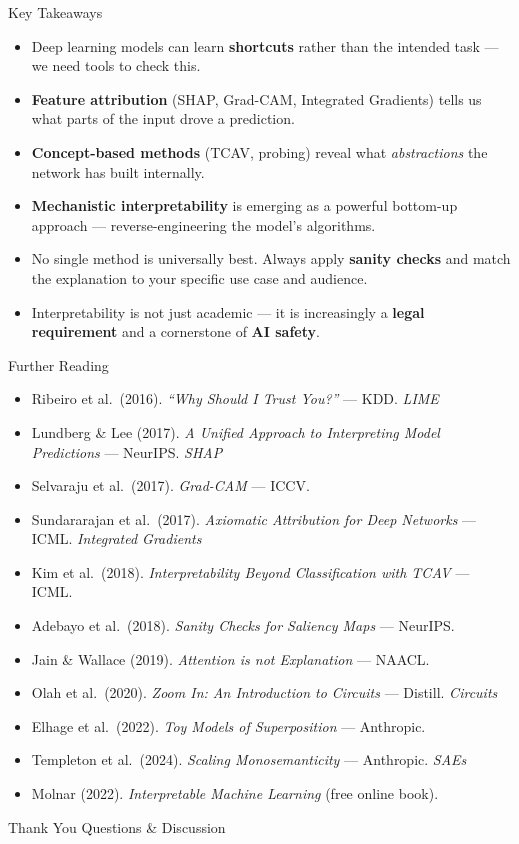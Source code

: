 \documentclass[aspectratio=169]{beamer}
\begin{document}
\begin{frame}{Key Takeaways}
  \begin{itemize}
    \setlength\itemsep{0.7em}
    \item Deep learning models can learn \textbf{shortcuts} rather than
          the intended task — we need tools to check this.
    \item \textbf{Feature attribution} (SHAP, Grad-CAM, Integrated Gradients)
          tells us what parts of the input drove a prediction.
    \item \textbf{Concept-based methods} (TCAV, probing) reveal what
          \emph{abstractions} the network has built internally.
    \item \textbf{Mechanistic interpretability} is emerging as a powerful
          bottom-up approach — reverse-engineering the model's algorithms.
    \item No single method is universally best. Always apply
          \textbf{sanity checks} and match the explanation to your
          specific use case and audience.
    \item Interpretability is not just academic — it is increasingly a
          \textbf{legal requirement} and a cornerstone of \textbf{AI safety}.
  \end{itemize}
\end{frame}

\begin{frame}{Further Reading}
  \footnotesize
  \begin{itemize}
    \item Ribeiro et al.\ (2016). \textit{``Why Should I Trust You?''} — KDD.
          \hfill \textit{LIME}
    \item Lundberg \& Lee (2017). \textit{A Unified Approach to Interpreting Model Predictions}
          — NeurIPS. \hfill \textit{SHAP}
    \item Selvaraju et al.\ (2017). \textit{Grad-CAM} — ICCV.
    \item Sundararajan et al.\ (2017). \textit{Axiomatic Attribution for Deep Networks}
          — ICML. \hfill \textit{Integrated Gradients}
    \item Kim et al.\ (2018). \textit{Interpretability Beyond Classification with TCAV}
          — ICML.
    \item Adebayo et al.\ (2018). \textit{Sanity Checks for Saliency Maps} — NeurIPS.
    \item Jain \& Wallace (2019). \textit{Attention is not Explanation} — NAACL.
    \item Olah et al.\ (2020). \textit{Zoom In: An Introduction to Circuits}
          — Distill. \hfill \textit{Circuits}
    \item Elhage et al.\ (2022). \textit{Toy Models of Superposition} — Anthropic.
    \item Templeton et al.\ (2024). \textit{Scaling Monosemanticity} — Anthropic.
          \hfill \textit{SAEs}
    \item Molnar (2022). \textit{Interpretable Machine Learning} (free online book).
  \end{itemize}
\end{frame}

\begin{frame}[standout]
  \Huge Thank You
  \vspace{0.8em}
  \normalsize
  Questions \& Discussion
\end{frame}
\end{document}
